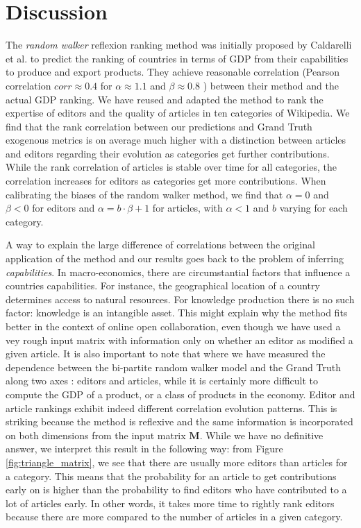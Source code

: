 \section{Discussion}
The {\it random walker} reflexion ranking method was initially proposed by Caldarelli et al. \cite{caldarelli2012networks} to predict the ranking of countries in terms of GDP from their capabilities to produce and export products. They achieve reasonable correlation (Pearson correlation $corr \approx 0.4$ for $\alpha \approx 1.1$ and $\beta \approx 0.8$ ) between their method and the actual GDP ranking. We have reused and adapted the method to rank the expertise of editors and the quality of articles in ten categories of Wikipedia. We find that the rank correlation between our predictions and Grand Truth exogenous metrics is on average much higher with a distinction between articles and editors regarding their evolution as categories get further contributions. While the rank correlation of articles is stable over time for all categories, the correlation increases for editors as categories get more contributions. When calibrating the biases of the random walker method, we find that $\alpha=0$ and $\beta <0 $ for editors and $\alpha = b\cdot \beta + 1$ for articles, with  $\alpha <1 $ and $b$ varying for each category.

A way to explain the large difference of correlations between the original application of the method and our results goes back to the problem of inferring {\it capabilities}. In macro-economics, there are circumstantial factors that influence a countries capabilities. For instance, the geographical location of a country determines access to natural resources. For knowledge production there is no such factor: knowledge is an intangible asset. This might explain why the method fits better in the context of online open collaboration, even though we have used a vey rough input matrix with information only on whether an editor as modified a given article. It is also important to note that where we have measured the dependence between the bi-partite random walker model and the Grand Truth along two axes : editors and articles, while it is certainly more difficult to compute the GDP of a product, or a class of products in the economy. Editor and article rankings exhibit indeed different correlation evolution patterns. This is striking because the method is reflexive and the same information is incorporated on both dimensions from the input matrix $\mathbf{M}$. While we have no definitive answer, we interpret this result in the following way: from Figure \ref{fig:triangle_matrix}, we see that there are usually more editors than articles for a category. This means that the probability for an article to get contributions early on is higher than the probability to find editors who have contributed to a lot of articles early. In other words, it takes more time to rightly rank editors because there are more compared to the number of articles in a given category.

